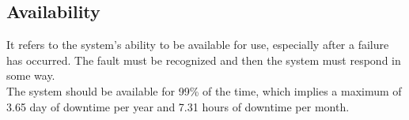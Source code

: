 \subsection{Availability}

It refers to the system's ability to be available for use, especially after a failure has occurred. The fault must be recognized and then the system must respond in some way.\\
The system should be available for 99\% of the time, which implies a maximum of 3.65 day of downtime per year and 7.31 hours of downtime per month.